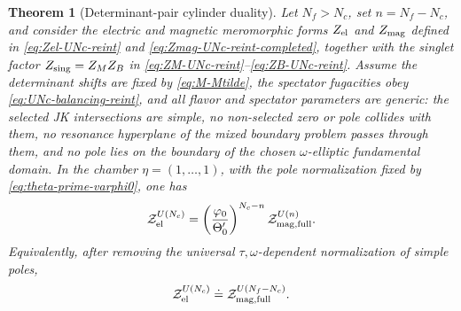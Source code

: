\documentclass[11pt,a4paper]{article}
\numberwithin{equation}{section}
\theoremstyle{plain}
\newtheorem{theorem}{Theorem}[section]
\theoremstyle{definition}
\theoremstyle{remark}
\begin{document}
\begin{theorem}[Determinant-pair cylinder duality]
\label{thm:determinant-pair-cylinder-duality}
Let \(N_f>N_c\), set \(n=N_f-N_c\), and consider the electric and magnetic meromorphic forms \(Z_{\rm el}\) and \(Z_{\rm mag}\) defined in \eqref{eq:Zel-UNc-reint} and \eqref{eq:Zmag-UNc-reint-completed}, together with the singlet factor \(Z_{\rm sing}=Z_MZ_B\) in \eqref{eq:ZM-UNc-reint}--\eqref{eq:ZB-UNc-reint}.  Assume the determinant shifts are fixed by \eqref{eq:M-Mtilde}, the spectator fugacities obey \eqref{eq:UNc-balancing-reint}, and all flavor and spectator parameters are generic: the selected JK intersections are simple, no non-selected zero or pole collides with them, no resonance hyperplane of the mixed boundary problem passes through them, and no pole lies on the boundary of the chosen \(\omega\)-elliptic fundamental domain.  In the chamber \(\eta=(1,\ldots,1)\), with the pole normalization fixed by \eqref{eq:theta-prime-varphi0}, one has
\begin{equation}
\mathcal Z_{\rm el}^{U(N_c)}
=
\left(\frac{\varphi_0}{\Theta'_0}\right)^{N_c-n}
\mathcal Z_{\rm mag,full}^{U(n)} .
\label{eq:thm-det-pair-cylinder-duality}
\end{equation}
Equivalently, after removing the universal \(\tau,\omega\)-dependent normalization of simple poles,
\begin{equation}
\mathcal Z_{\rm el}^{U(N_c)}
\doteq
\mathcal Z_{\rm mag,full}^{U(N_f-N_c)} .
\end{equation}
\end{theorem}
\end{document}
